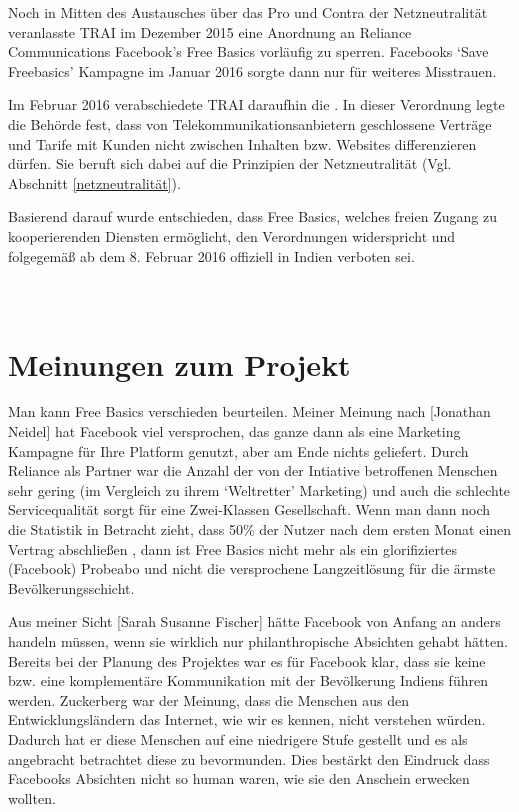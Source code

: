 \documentclass{article}
\begin{document}
Noch in Mitten des Austausches über das Pro und Contra der Netzneutralität veranlasste TRAI im Dezember 2015 eine Anordnung an Reliance Communications Facebook's Free Basics vorläufig zu sperren\autocite{governanceAsIdeology}.
Facebooks `Save Freebasics' Kampagne im Januar 2016 sorgte dann nur für weiteres Misstrauen.

Im Februar 2016 verabschiedete TRAI daraufhin die \textcite{regulationBan}.
In dieser Verordnung legte die Behörde fest, dass von Telekommunikationsanbietern geschlossene Verträge und Tarife mit Kunden nicht zwischen Inhalten bzw. Websites differenzieren dürfen.
Sie beruft sich dabei auf die Prinzipien der Netzneutralität (Vgl. Abschnitt \ref{netzneutralität}).

Basierend darauf wurde entschieden, dass Free Basics, welches freien Zugang zu kooperierenden Diensten ermöglicht, den
Verordnungen widerspricht und folgegemäß ab dem 8. Februar 2016 offiziell in Indien verboten sei.

\break
\appendix
\section{\\Meinungen zum Projekt}

Man kann Free Basics verschieden beurteilen. Meiner Meinung nach [Jonathan Neidel] hat Facebook viel versprochen, das ganze dann als eine Marketing Kampagne für Ihre Platform genutzt, aber am Ende nichts geliefert. Durch Reliance als Partner war die Anzahl der von der Intiative betroffenen Menschen sehr gering (im Vergleich zu ihrem `Weltretter' Marketing) und auch die schlechte Servicequalität sorgt für eine Zwei-Klassen Gesellschaft. Wenn man dann noch die Statistik in Betracht zieht, dass 50\% der Nutzer nach dem ersten Monat einen Vertrag abschließen \parencite{everydayLife}, dann ist Free Basics nicht mehr als ein glorifiziertes (Facebook) Probeabo und nicht die versprochene Langzeitlösung für die ärmste Bevölkerungsschicht.

\medskip

Aus meiner Sicht [Sarah Susanne Fischer] hätte Facebook von Anfang an anders handeln müssen, wenn sie wirklich nur philanthropische Absichten gehabt hätten. Bereits bei der Planung des Projektes war es für Facebook klar, dass sie keine bzw. eine komplementäre Kommunikation mit der Bevölkerung Indiens führen werden. Zuckerberg war der Meinung, dass die Menschen aus den Entwicklungsländern das Internet, wie wir es kennen, nicht verstehen würden. Dadurch hat er diese Menschen auf eine niedrigere Stufe gestellt und es als angebracht betrachtet diese zu bevormunden. 
Dies bestärkt den Eindruck dass Facebooks Absichten nicht so human waren, wie sie den Anschein erwecken wollten.
\end{document}
